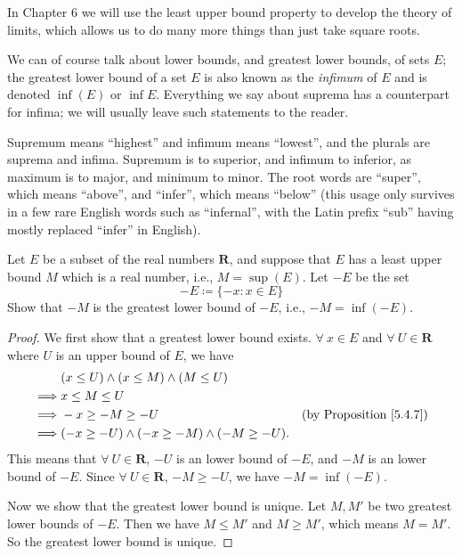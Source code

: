 \begin{remark}\label{5.5.14}
In Chapter 6 we will use the least upper bound property to develop the theory of limits, which allows us to do many more things than just take square roots.
\end{remark}

\begin{remark}\label{5.5.15}
We can of course talk about lower bounds, and greatest lower bounds, of sets \(E\);
the greatest lower bound of a set \(E\) is also known as the \emph{infimum} of \(E\) and is denoted \(\inf(E)\) or \(\inf E\).
Everything we say about suprema has a counterpart for infima;
we will usually leave such statements to the reader.
\end{remark}

\begin{note}
Supremum means ``highest'' and infimum means ``lowest'', and the plurals are suprema and infima.
Supremum is to superior, and infimum to inferior, as maximum is to major, and minimum to minor.
The root words are ``super'', which means ``above'', and ``infer'', which means ``below''
(this usage only survives in a few rare English words such as ``infernal'', with the Latin prefix ``sub'' having mostly replaced ``infer'' in English).
\end{note}

\exercisesection

\begin{exercise}\label{ex 5.5.1}
Let \(E\) be a subset of the real numbers \(\mathbf{R}\), and suppose that \(E\) has a least upper bound \(M\) which is a real number, i.e., \(M = \sup(E)\).
Let \(-E\) be the set
\[
    -E \coloneqq \{-x : x \in E\}
\]
Show that \(-M\) is the greatest lower bound of \(-E\), i.e., \(-M = \inf(-E)\).
\end{exercise}

\begin{proof}
We first show that a greatest lower bound exists.
\(\forall\ x \in E\) and \(\forall\ U \in \mathbf{R}\) where \(U\) is an upper bound of \(E\), we have
\begin{align*}
& (x \leq U) \land (x \leq M) \land (M \leq U) \\
\implies & x \leq M \leq U \\
\implies & -x \geq -M \geq -U & \text{(by Proposition \ref{5.4.7})} \\
\implies & (-x \geq -U) \land (-x \geq -M) \land (-M \geq -U).
\end{align*}
This means that \(\forall\ U \in \mathbf{R}\), \(-U\) is an lower bound of \(-E\), and \(-M\) is an lower bound of \(-E\).
Since \(\forall\ U \in \mathbf{R}\), \(-M \geq -U\), we have \(-M = \inf(-E)\).

Now we show that the greatest lower bound is unique.
Let \(M, M'\) be two greatest lower bounds of \(-E\).
Then we have \(M \leq M'\) and \(M \geq M'\), which means \(M = M'\).
So the greatest lower bound is unique.
\end{proof}

